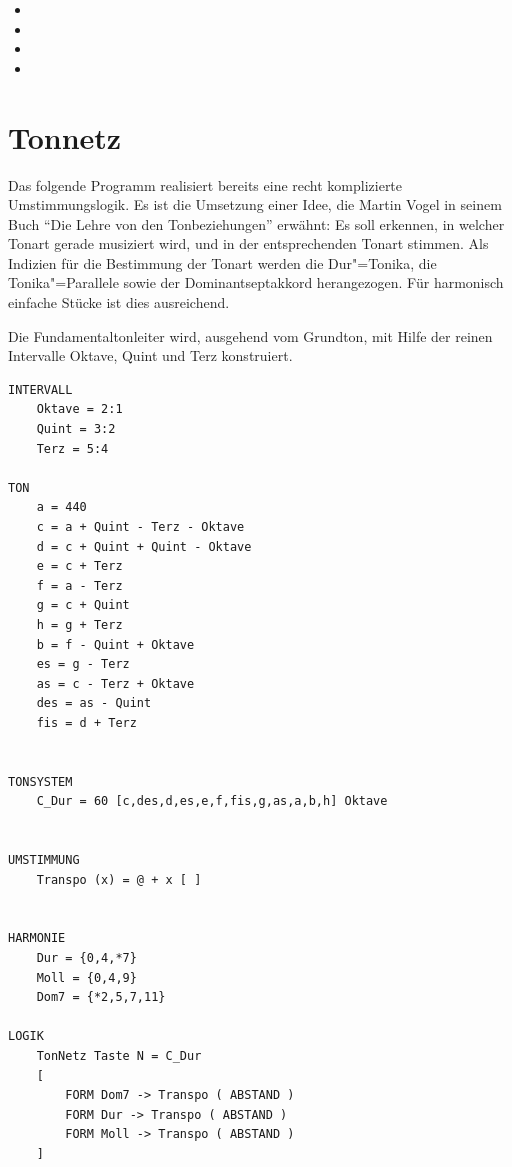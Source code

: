 {\begin{itemize}
\item {} 
\item {}
\item {}
\item {}
\end{itemize}



\section{Tonnetz}
\label{sec:EX_TONENET}
Das folgende Programm realisiert bereits eine recht komplizierte 
Umstimmungslogik. Es ist die Umsetzung einer Idee, die Martin 
Vogel in seinem Buch "`Die Lehre von den Tonbeziehungen"' erwähnt: 
Es soll erkennen, in welcher Tonart gerade musiziert wird, und 
in der entsprechenden Tonart  stimmen. Als 
Indizien für die Bestimmung der Tonart werden die Dur"=Tonika, 
die Tonika"=Parallele sowie der Dominantseptakkord herangezogen. 
Für harmonisch einfache Stücke ist dies ausreichend.

Die Fundamentaltonleiter wird, ausgehend vom Grundton, mit Hilfe 
der reinen Intervalle Oktave, Quint und Terz konstruiert.


\begin{verbatim}
INTERVALL  
    Oktave = 2:1
    Quint = 3:2 
    Terz = 5:4

TON
    a = 440 
    c = a + Quint - Terz - Oktave 
    d = c + Quint + Quint - Oktave 
    e = c + Terz  
    f = a - Terz 
    g = c + Quint 
    h = g + Terz  
    b = f - Quint + Oktave 
    es = g - Terz 
    as = c - Terz + Oktave 
    des = as - Quint 
    fis = d + Terz 


TONSYSTEM  
    C_Dur = 60 [c,des,d,es,e,f,fis,g,as,a,b,h] Oktave


UMSTIMMUNG 
    Transpo (x) = @ + x [ ]


HARMONIE 
    Dur = {0,4,*7}
    Moll = {0,4,9} 
    Dom7 = {*2,5,7,11}

LOGIK 
    TonNetz Taste N = C_Dur
    [ 
        FORM Dom7 -> Transpo ( ABSTAND ) 
        FORM Dur -> Transpo ( ABSTAND )  
        FORM Moll -> Transpo ( ABSTAND )  
    ]
\end{verbatim}


}
